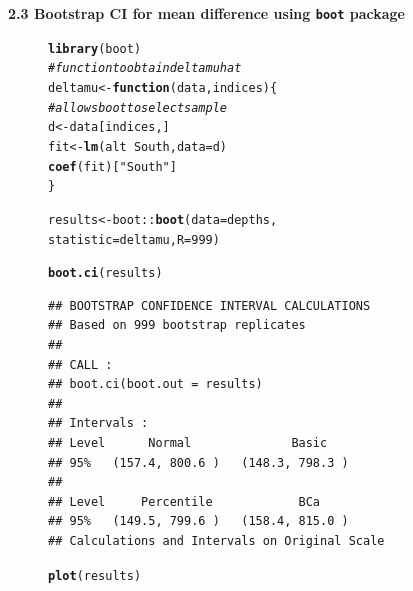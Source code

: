 \documentclass[10pt]{beamer}\usepackage[]{graphicx}\usepackage[]{color}
\makeatletter
\newcommand{\hlnum}[1]{\textcolor[rgb]{0.686,0.059,0.569}{#1}}%
\newcommand{\hlstr}[1]{\textcolor[rgb]{0.192,0.494,0.8}{#1}}%
\newcommand{\hlcom}[1]{\textcolor[rgb]{0.678,0.584,0.686}{\textit{#1}}}%
\newcommand{\hlopt}[1]{\textcolor[rgb]{0,0,0}{#1}}%
\newcommand{\hlstd}[1]{\textcolor[rgb]{0.345,0.345,0.345}{#1}}%
\newcommand{\hlkwa}[1]{\textcolor[rgb]{0.161,0.373,0.58}{\textbf{#1}}}%
\newcommand{\hlkwb}[1]{\textcolor[rgb]{0.69,0.353,0.396}{#1}}%
\newcommand{\hlkwc}[1]{\textcolor[rgb]{0.333,0.667,0.333}{#1}}%
\newcommand{\hlkwd}[1]{\textcolor[rgb]{0.737,0.353,0.396}{\textbf{#1}}}%
\newenvironment{kframe}{%
 \def\at@end@of@kframe{}%
 \ifinner\ifhmode%
  \def\at@end@of@kframe{\end{minipage}}%
  \begin{minipage}{\columnwidth}%
 \fi\fi%
 \def\FrameCommand##1{\hskip\@totalleftmargin \hskip-\fboxsep
 \colorbox{shadecolor}{##1}\hskip-\fboxsep
     \hskip-\linewidth \hskip-\@totalleftmargin \hskip\columnwidth}%
 \MakeFramed {\advance\hsize-\width
   \@totalleftmargin\z@ \linewidth\hsize
   \@setminipage}}%
 {\par\unskip\endMakeFramed%
 \at@end@of@kframe}
\newenvironment{knitrout}{}{} %
\makeatother
\begin{document}
\begin{frame}
\begin{figure}
\begin{minipage}[h]{0.50\linewidth}
\begin{knitrout}
{}


\end{knitrout}
\end{minipage}
\end{figure}
	
	
\end{frame}




\begin{frame}
		\textbf{2.3 Bootstrap CI for mean difference using \texttt{boot} package}
\begin{figure}
	\begin{minipage}[h]{0.40\linewidth}
\begin{knitrout}\tiny
{}\color{fgcolor}\begin{kframe}
\begin{alltt}
\hlkwd{library}\hlstd{(boot)}
\hlcom{# function to obtain deltamu hat}
\hlstd{deltamu} \hlkwb{<-} \hlkwa{function}\hlstd{(}\hlkwc{data}\hlstd{,} \hlkwc{indices}\hlstd{) \{}
        \hlcom{# allows boot to select sample}
        \hlstd{d} \hlkwb{<-} \hlstd{data[indices,]}
        \hlstd{fit} \hlkwb{<-} \hlkwd{lm}\hlstd{(alt} \hlopt{~} \hlstd{South,} \hlkwc{data}\hlstd{=d)}
        \hlkwd{coef}\hlstd{(fit)[}\hlstr{"South"}\hlstd{]}
\hlstd{\}}

\hlstd{results} \hlkwb{<-} \hlstd{boot}\hlopt{::}\hlkwd{boot}\hlstd{(}\hlkwc{data} \hlstd{= depths,}
\hlkwc{statistic} \hlstd{= deltamu,} \hlkwc{R}\hlstd{=}\hlnum{999}\hlstd{)}

\hlkwd{boot.ci}\hlstd{(results)}
\end{alltt}
\begin{verbatim}
## BOOTSTRAP CONFIDENCE INTERVAL CALCULATIONS
## Based on 999 bootstrap replicates
## 
## CALL : 
## boot.ci(boot.out = results)
## 
## Intervals : 
## Level      Normal              Basic         
## 95%   (157.4, 800.6 )   (148.3, 798.3 )  
## 
## Level     Percentile            BCa          
## 95%   (149.5, 799.6 )   (158.4, 815.0 )  
## Calculations and Intervals on Original Scale
\end{verbatim}
\end{kframe}
\end{knitrout}
		
	\end{minipage}
	\hspace{0.4cm}
	\begin{minipage}[h]{0.50\linewidth}
\begin{knitrout}\tiny
{}\color{fgcolor}\begin{kframe}
\begin{alltt}
\hlkwd{plot}\hlstd{(results)}
\end{alltt}
\end{kframe}


\end{knitrout}
\end{minipage}
\end{figure}
\end{frame}
\end{document}
